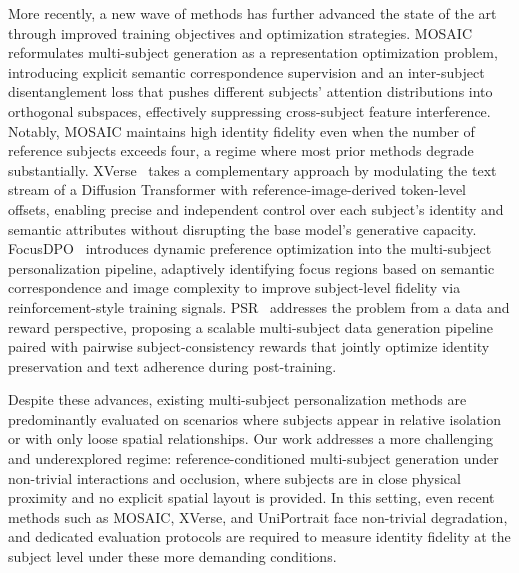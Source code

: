 \documentclass{article}
\begin{document}
More recently, a new wave of methods has further advanced the state of the art through improved training objectives and optimization strategies. MOSAIC~\cite{she2025mosaic} reformulates multi-subject generation as a representation optimization problem, introducing explicit semantic correspondence supervision and an inter-subject disentanglement loss that pushes different subjects' attention distributions into orthogonal subspaces, effectively suppressing cross-subject feature interference. Notably, MOSAIC maintains high identity fidelity even when the number of reference subjects exceeds four, a regime where most prior methods degrade substantially. XVerse~\cite{chen2025xverse} takes a complementary approach by modulating the text stream of a Diffusion Transformer with reference-image-derived token-level offsets, enabling precise and independent control over each subject's identity and semantic attributes without disrupting the base model's generative capacity. FocusDPO~\cite{jin2025focusdpo} introduces dynamic preference optimization into the multi-subject personalization pipeline, adaptively identifying focus regions based on semantic correspondence and image complexity to improve subject-level fidelity via reinforcement-style training signals. PSR~\cite{wang2025psr} addresses the problem from a data and reward perspective, proposing a scalable multi-subject data generation pipeline paired with pairwise subject-consistency rewards that jointly optimize identity preservation and text adherence during post-training.

Despite these advances, existing multi-subject personalization methods are predominantly evaluated on scenarios where subjects appear in relative isolation or with only loose spatial relationships. Our work addresses a more challenging and underexplored regime: reference-conditioned multi-subject generation under non-trivial interactions and occlusion, where subjects are in close physical proximity and no explicit spatial layout is provided. In this setting, even recent methods such as MOSAIC, XVerse, and UniPortrait face non-trivial degradation, and dedicated evaluation protocols are required to measure identity fidelity at the subject level under these more demanding conditions.
\end{document}
